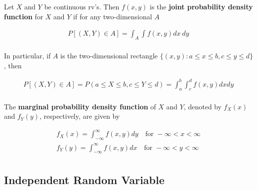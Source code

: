 \begin{definition}
    Let $X$ and $Y$ be continuous rv's. Then $f(x,y)$ is the \textbf{joint probability density function} for $X$ and $Y$ if for any two-dimensional $A$ 
    
    \begin{align*}
        P[(X,Y)\in A] = \int_A\int f(x,y)dx\ dy \\
    \end{align*}
    
    In particular, if $A$ is the two-dimensional rectangle $\{(x,y):a\leq x\leq b,c\leq y\leq d\}$, then 
    
    \begin{align*}
        P[(X,Y)\in A] = P(a\leq X\leq b, c\leq Y\leq d) = \int_a^b\int_c^d f(x,y)dx dy \\
    \end{align*}
\end{definition}

\begin{definition}
    The \textbf{marginal probability density function} of $X$ and $Y$, denoted by $f_X(x)$ and $f_Y(y)$, respectively, are given by 

    \begin{align*}
        f_X(x) = \int_{-\infty}^\infty f(x,y)dy \quad \text{for } -\infty<x<\infty \\
        f_Y(y) = \int_{-\infty}^\infty f(x,y)dx \quad \text{for } -\infty<y<\infty \\
    \end{align*}
\end{definition}

\subsection{Independent Random Variable}

